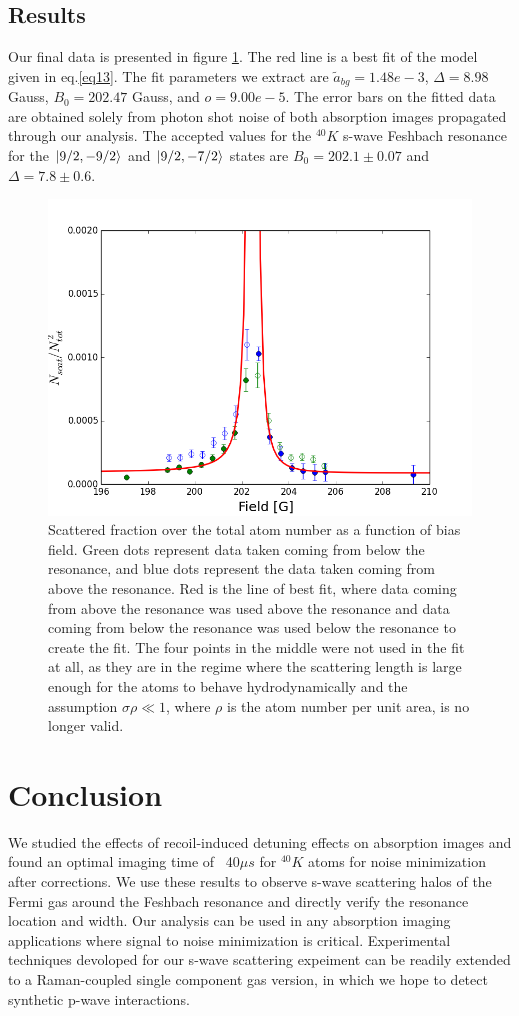 \documentclass[12pt]{iopart}
\begin{document}
\subsection{Results}
Our final data is presented in figure \ref{fig:fittedFractions}. The red line is a best fit of the model given in eq.\ref{eq13}. The fit parameters we extract are $\tilde{a}_{bg}=1.48e-3$, $\Delta = 8.98$ Gauss, $B_0 = 202.47$ Gauss, and $o=9.00e-5$. The error bars on the fitted data are obtained solely from photon shot noise of both absorption images propagated through our analysis.
The accepted values for the $^{40}K$ s-wave Feshbach resonance for the  $\mathinner{|{9/2,-9/2}\rangle}$ and $\mathinner{|{9/2,-7/2}\rangle}$ states are $B_0=202.1\pm0.07$ and $\Delta=7.8\pm0.6$. 
\begin{figure}
	\includegraphics[scale=0.57]{figure12}
\caption{Scattered fraction over the total atom number as a function of bias field. Green dots represent data taken coming from below the resonance, and blue dots represent the data taken coming from above the resonance. Red is the line of best fit, where data coming from above the resonance was used above the resonance and data coming from below the resonance was used below the resonance to create the fit. The four points in the middle were not used in the fit at all, as they are in the regime where the scattering length is large enough for the atoms to behave hydrodynamically and the assumption $\sigma\rho\ll1$, where $\rho$ is the atom number per unit area, is no longer valid.   }  
\label{fig:fittedFractions}
\end{figure}
\section{Conclusion}
We studied the effects of recoil-induced detuning effects on absorption images and found an optimal imaging time of ~40$\mu s$ for $^{40}K$ atoms for noise minimization after corrections. We use these results to observe s-wave scattering halos of the Fermi gas around the Feshbach resonance and directly verify the resonance location and width. Our analysis can be used in any absorption imaging applications where signal to noise minimization is critical. Experimental techniques devoloped for our s-wave scattering expeiment can be readily extended to a Raman-coupled single component gas version, in which we hope to detect synthetic p-wave interactions. 
\end{document}
